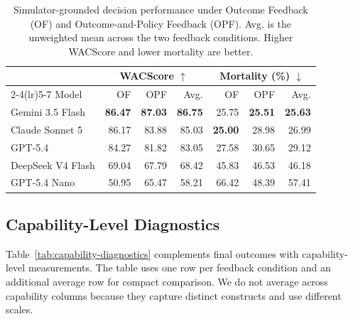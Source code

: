 \documentclass[letterpaper]{article} %
\begin{document}
\begin{table}[t]
    \centering
    \small
    \setlength{\tabcolsep}{5pt}
    \caption{Simulator-grounded decision performance under Outcome
    Feedback (OF) and Outcome-and-Policy Feedback (OPF). Avg. is the
    unweighted mean across the two feedback conditions. Higher
    WACScore and lower mortality are better.}
    \label{tab:outcome-performance}
    \begin{tabular}{lrrr rrr}
        \toprule
        & \multicolumn{3}{c}{WACScore $\uparrow$}
        & \multicolumn{3}{c}{Mortality (\%) $\downarrow$} \\
        \cmidrule(lr){2-4}\cmidrule(lr){5-7}
        Model & OF & OPF & Avg. & OF & OPF & Avg. \\
        \midrule
        Gemini 3.5 Flash   & \textbf{86.47} & \textbf{87.03} & \textbf{86.75} & 25.75 & \textbf{25.51} & \textbf{25.63} \\
        Claude Sonnet 5    & 86.17 & 83.88 & 85.03 & \textbf{25.00} & 28.98 & 26.99 \\
        GPT-5.4            & 84.27 & 81.82 & 83.05 & 27.58 & 30.65 & 29.12 \\
        DeepSeek V4 Flash  & 69.04 & 67.79 & 68.42 & 45.83 & 46.53 & 46.18 \\
        GPT-5.4 Nano       & 50.95 & 65.47 & 58.21 & 66.42 & 48.39 & 57.41 \\
        \bottomrule
    \end{tabular}
\end{table}

\subsection{Capability-Level Diagnostics}

Table~\ref{tab:capability-diagnostics} complements final outcomes with
capability-level measurements. The table uses one row per feedback
condition and an additional average row for compact comparison. We do
not average across capability columns because they capture distinct
constructs and use different scales.
\end{document}
